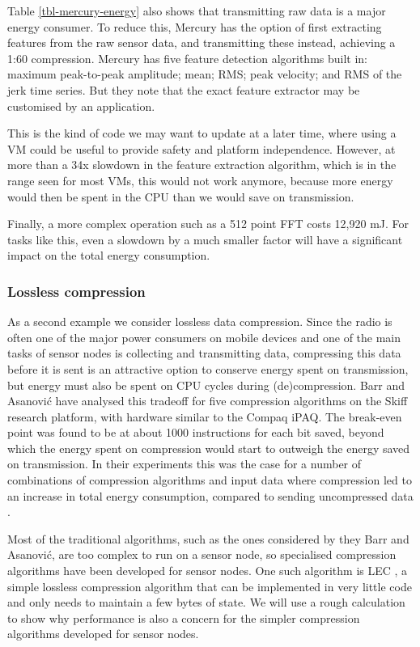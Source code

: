 Table \ref{tbl-mercury-energy} also shows that transmitting raw data is a major energy consumer. To reduce this, Mercury has the option of first extracting features from the raw sensor data, and transmitting these instead, achieving a 1:60 compression. Mercury has five feature detection algorithms built in: maximum peak-to-peak amplitude; mean; RMS; peak velocity; and RMS of the jerk time series. But they note that the exact feature extractor may be customised by an application.

This is the kind of code we may want to update at a later time, where using a VM could be useful to provide safety and platform independence. However, at more than a 34x slowdown in the feature extraction algorithm, which is in the range seen for most VMs, this would not work anymore, because more energy would then be spent in the CPU than we would save on transmission.

Finally, a more complex operation such as a 512 point FFT costs 12,920 mJ. For tasks like this, even a slowdown by a much smaller factor will have a significant impact on the total energy consumption.

\subsubsection{Lossless compression}
As a second example we consider lossless data compression. Since the radio is often one of the major power consumers on mobile devices and one of the main tasks of sensor nodes is collecting and transmitting data, compressing this data before it is sent is an attractive option to conserve energy spent on transmission, but energy must also be spent on CPU cycles during (de)compression. Barr and Asanovi\'c have analysed this tradeoff for five compression algorithms on the Skiff research platform, with hardware similar to the Compaq iPAQ. The break-even point was found to be at about 1000 instructions for each bit saved, beyond which the energy spent on compression would start to outweigh the energy saved on transmission. In their experiments this was the case for a number of combinations of compression algorithms and input data where compression led to an increase in total energy consumption, compared to sending uncompressed data \cite{Barr:2006vg}.

Most of the traditional algorithms, such as the ones considered by they Barr and Asanovi\'c, are too complex to run on a sensor node, so specialised compression algorithms have been developed for sensor nodes. One such algorithm is LEC \cite{Marcelloni:2009ja}, a simple lossless compression algorithm that can be implemented in very little code and only needs to maintain a few bytes of state. We will use a rough calculation to show why performance is also a concern for the simpler compression algorithms developed for sensor nodes.

